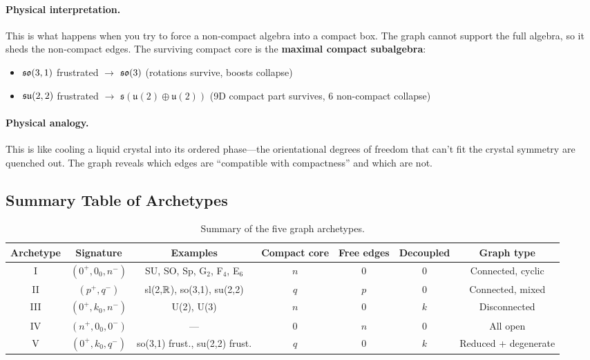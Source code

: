 \paragraph{Physical interpretation.} This is what happens when you try to force a non-compact algebra into a compact box. The graph cannot support the full algebra, so it sheds the non-compact edges. The surviving compact core is the \textbf{maximal compact subalgebra}:
\begin{itemize}
    \item $\mathfrak{so}(3,1)$ frustrated $\to$ $\mathfrak{so}(3)$ (rotations survive, boosts collapse)
    \item $\mathfrak{su}(2,2)$ frustrated $\to$ $\mathfrak{s}(\mathfrak{u}(2) \oplus \mathfrak{u}(2))$ (9D compact part survives, 6 non-compact collapse)
\end{itemize}

\paragraph{Physical analogy.} This is like cooling a liquid crystal into its ordered phase---the orientational degrees of freedom that can't fit the crystal symmetry are quenched out. The graph reveals which edges are ``compatible with compactness'' and which are not.

\subsection{Summary Table of Archetypes}\label{sec:archetype_summary}

\begin{table}[h]
\centering
\begin{tabular}{c c c c c c c}
\hline\hline
Archetype & Signature & Examples & Compact core & Free edges & Decoupled & Graph type \\
\hline
I & $(0^+, 0_0, n^-)$ & SU, SO, Sp, G$_2$, F$_4$, E$_6$ & $n$ & 0 & 0 & Connected, cyclic \\
II & $(p^+, q^-)$ & sl(2,$\mathbb{R}$), so(3,1), su(2,2) & $q$ & $p$ & 0 & Connected, mixed \\
III & $(0^+, k_0, n^-)$ & U(2), U(3) & $n$ & 0 & $k$ & Disconnected \\
IV & $(n^+, 0_0, 0^-)$ & --- & 0 & $n$ & 0 & All open \\
V & $(0^+, k_0, q^-)$ & so(3,1) frust., su(2,2) frust. & $q$ & 0 & $k$ & Reduced + degenerate \\
\hline\hline
\end{tabular}
\caption{Summary of the five graph archetypes.}
\end{table}
